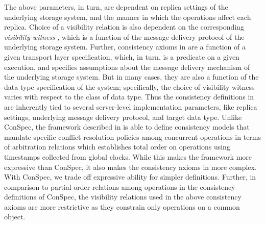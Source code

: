 \documentclass[journal,compsoc]{IEEEtran}
\begin{document}
   The above parameters, in turn,  are dependent on replica settings of the underlying storage system, and the manner in which the operations affect each replica.  Choice of a visibility relation is also dependent on the corresponding \emph{visibility witness}  \cite{DBLP:conf/popl/BurckhardtGYZ14},  which is a function of the message delivery protocol  of the underlying storage system. Further, consistency axioms in  \cite{DBLP:conf/popl/BurckhardtGYZ14, understanding-eventual-consistency, Burckhardt:2014:PEC:2693641.2693642}  are a function of a given transport layer specification, which, in turn, is a predicate on a given execution, and  specifies assumptions about the message delivery mechanism of the underlying storage system. But in many cases, they are also a function of the data type specification of the system; specifically,  the choice of visibility witness varies with respect to the class of data type. %
 Thus the consistency definitions in \cite{DBLP:conf/popl/BurckhardtGYZ14, understanding-eventual-consistency, Burckhardt:2014:PEC:2693641.2693642}  are inherently tied to several server-level implementation parameters, like replica settings, underlying message delivery protocol, and target data type.  %
  Unlike ConSpec, the framework described in  \cite{DBLP:conf/popl/BurckhardtGYZ14, understanding-eventual-consistency, Burckhardt:2014:PEC:2693641.2693642} is able to define consistency models that mandate specific conflict resolution policies among concurrent operations in terms of arbitration relations which establishes total order on operations using timestamps collected from global clocks.  While this makes the framework more expressive than ConSpec, it also makes the consistency axioms in  \cite{DBLP:conf/popl/BurckhardtGYZ14, understanding-eventual-consistency, Burckhardt:2014:PEC:2693641.2693642} more complex. With ConSpec, we trade off expressive ability for  simpler definitions. Further, in comparison to partial order relations among operations in the consistency definitions of ConSpec, the visibility relations used in the above consistency axioms are more restrictive  as they constrain only operations on a common object. 
\end{document}
